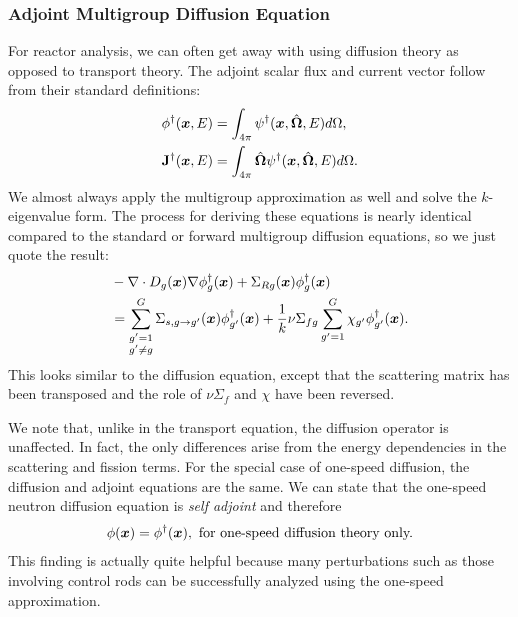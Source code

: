 \subsubsection{Adjoint Multigroup Diffusion Equation}

For reactor analysis, we can often get away with using diffusion theory as opposed to transport theory. The adjoint scalar flux and current vector follow from their standard definitions:
\begin{subequations}
\begin{align}
  \phi^\dagger(\bm{x},E) &= \int_{4\pi} \psi^\dagger(\bm{x},\hat{\mathbf{\Omega}},E) d\Omega, \\
  \mathbf{J}^\dagger(\bm{x},E) &= \int_{4\pi} \hat{\mathbf{\Omega}} \psi^\dagger(\bm{x},\hat{\mathbf{\Omega}},E) d\Omega .
\end{align}
\end{subequations}
We almost always apply the multigroup approximation as well and solve the $k$-eigenvalue form. The process for deriving these equations is nearly identical compared to the standard or forward multigroup diffusion equations, so we just quote the result:
\begin{align}
  &- \nabla \cdot D_g(\bm{x}) \nabla \phi_g^\dagger(\bm{x}) + \Sigma_{Rg}(\bm{x}) \phi^\dagger_g(\bm{x}) \nonumber \\*
  &= \sum_{\substack{g' =1 \\ g' \ne g}}^G  \Sigma_{s,g \rightarrow g'}(\bm{x}) \phi^\dagger_{g'}(\bm{x}) + \frac{1}{k} \nu\Sigma_{fg} \sum_{g'=1}^G   \chi_{g'} \phi^\dagger_{g'}(\bm{x}) .
\end{align}
This looks similar to the diffusion equation, except that the scattering matrix has been transposed and the role of $\nu\Sigma_f$ and $\chi$ have been reversed. 

We note that, unlike in the transport equation, the diffusion operator is unaffected. In fact, the only differences arise from the energy dependencies in the scattering and fission terms. For the special case of one-speed diffusion, the diffusion and adjoint equations are the same. We can state that the one-speed neutron diffusion equation is \emph{self adjoint} and therefore
\begin{align}
  \phi(\bm{x}) = \phi^\dagger(\bm{x}), \text{ for one-speed diffusion theory only.}
\end{align}
This finding is actually quite helpful because many perturbations such as those involving control rods can be successfully analyzed using the one-speed approximation.

